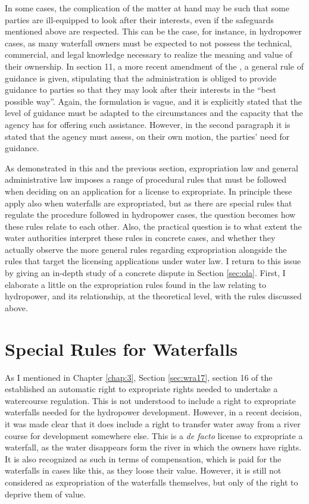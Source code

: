 In some cases, the complication of the matter at hand may be such that some parties are ill-equipped to look after their interests, even if the safeguards mentioned above are respected. This can be the case, for instance, in hydropower cases, as many waterfall owners must be expected to not possess the technical, commercial, and legal knowledge necessary to realize the meaning and value of their ownership. In section 11, a more recent amendment of the \cite{paa67}, a general rule of guidance is given, stipulating that the administration is obliged to provide guidance to parties so that they may look after their interests in the ``best possible way''. Again, the formulation is vague, and it is explicitly stated that the level of guidance must be adapted to the circumstances and the capacity that the agency has for offering such assistance. However, in the second paragraph it is stated that the agency must assess, on their own motion, the parties' need for guidance.

As demonstrated in this and the previous section, expropriation law and general administrative law imposes a range of procedural rules that must be followed when deciding on an application for a license to expropriate. In principle these apply also when waterfalls are expropriated, but as there are special rules that regulate the procedure followed in hydropower cases, the question becomes how these rules relate to each other. Also, the practical question is to what extent the water authorities interpret these rules in concrete cases, and whether they actually observe the more general rules regarding expropriation alongside the rules that target the licensing applications under water law. I return to this issue by giving an in-depth study of a concrete dispute in Section \ref{sec:ola}. First, I elaborate a little on the expropriation rules found in the law relating to hydropower, and its relationship, at the theoretical level, with the rules discussed above.

\section{Special Rules for Waterfalls}\label{sec:special}

As I mentioned in Chapter \ref{chap:3}, Section \ref{sec:wra17}, section 16 of the \cite{wra17} established an automatic right to expropriate rights needed to undertake a watercourse regulation. This is not understood to include a right to expropriate waterfalls needed for the hydropower development. However, in a recent decision, it was made clear that it does include a right to transfer water away from a river course for development somewhere else. This is a {\it de facto} license to expropriate a waterfall, as the water disappears form the river in which the owners have rights. It is also recognized as such in terms of compensation, which is paid for the waterfalls in cases like this, as they loose their value. However, it is still not considered as expropriation of the waterfalls themselves, but only of the right to deprive them of value.

